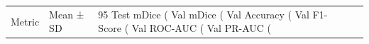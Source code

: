 \begin{tabular}{lllll}
\toprule
Metric & Mean ± SD & 95%
\midrule
Test mDice (%
Val mDice (%
Val Accuracy (%
Val F1-Score (%
Val ROC-AUC (%
Val PR-AUC (%
\bottomrule
\end{tabular}
